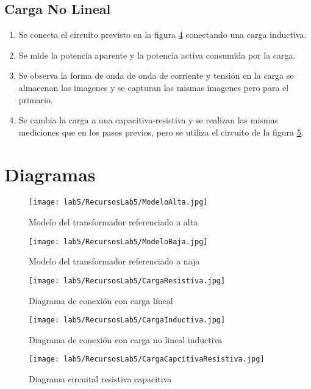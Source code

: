 \documentclass[11pt,letterpaper]{article}     %
\begin{document}
\subsection{Carga No Lineal}
\begin{enumerate}
	\item Se conecta el circuito previsto en la figura \ref{DiagramaNoLineal} conectando una carga inductiva.
	\item Se mide la potencia aparente y la potencia activa consumida por la carga.
	\item Se observa la forma de onda de onda de corriente y tensión en la carga se almacenan las imagenes y se capturan las mismas imagenes pero para el primario.
	\item Se cambia la carga a una capacitiva-resistiva y se realizan las mismas mediciones que en los pasos previos, pero se utiliza el circuito de la figura \ref{DiagramaNoLinealCapacitiva}.
\end{enumerate}
\section{Diagramas}
\begin{figure}[H]
    \centering
    \texttt{[image: lab5/RecursosLab5/ModeloAlta.jpg]}
    \caption{Modelo del transformador referenciado a alta}
    \label{fig:ModeloTransformadorAlta}
\end{figure}
\begin{figure}[H]
    \centering
    \texttt{[image: lab5/RecursosLab5/ModeloBaja.jpg]}
    \caption{Modelo del transformador referenciado a naja}
    \label{fig:ModeloTransformadorBaja}
\end{figure}
\begin{figure}[H]
    \centering
    \texttt{[image: lab5/RecursosLab5/CargaResistiva.jpg]}
    \caption{Diagrama de conexión con carga líneal}
    \label{diagramaLineal}
\end{figure}
\begin{figure}[H]
    \centering
    \texttt{[image: lab5/RecursosLab5/CargaInductiva.jpg]}
    \caption{Diagrama de conexión con carga no lineal inductiva}
    \label{DiagramaNoLineal}
\end{figure}
\begin{figure}[H]
    \centering
    \texttt{[image: lab5/RecursosLab5/CargaCapcitivaResistiva.jpg]}
    \caption{Diagrama circuital resistiva capacitiva}
    \label{DiagramaNoLinealCapacitiva}
\end{figure}
\end{document}
